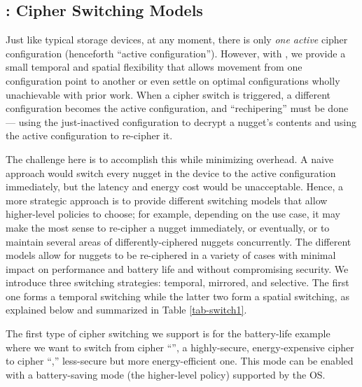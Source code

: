 

\subsection{\sysA: Cipher Switching Models} 
\label{subsec:strategies}


Just like typical storage devices, at any moment, there is only {\em one active} cipher
configuration (henceforth ``active configuration'').  However, with \sysA, we
provide a small temporal and spatial flexibility that allows movement
from one configuration point to another or even settle on optimal
configurations wholly unachievable with prior work.  When a cipher switch
is triggered, a different configuration becomes the active configuration,
and ``rechipering'' must be done --- using the just-inactived
configuration to decrypt a nugget's contents and using the active
configuration to re-cipher it.

The challenge here is to accomplish this while minimizing overhead.  A
naive approach would switch every nugget in the device to the active
configuration immediately, but the latency and energy cost would be
unacceptable.  Hence, a more strategic approach is to provide different
switching models that allow higher-level policies to choose; for example,
depending on the use case, it may make the most sense to re-cipher a
nugget immediately, or eventually, or to maintain several areas of
differently-ciphered nuggets concurrently.  The different models allow for
nuggets to be re-ciphered in a variety of cases with minimal impact on
performance and battery life and without compromising security.  We
introduce three switching strategies: temporal, mirrored, and selective.
The first one forms a temporal switching while the latter two form a
spatial switching, as explained below and summarized in Table
\ref{tab-switch1}.







  The first type of cipher switching we support
is for the battery-life example where we want to switch from cipher
``\cone'', a highly-secure, energy-expensive cipher to cipher ``\ctwo,''
less-secure but more energy-efficient one.  This mode can be enabled with
a battery-saving mode (the higher-level policy) supported by the OS.

